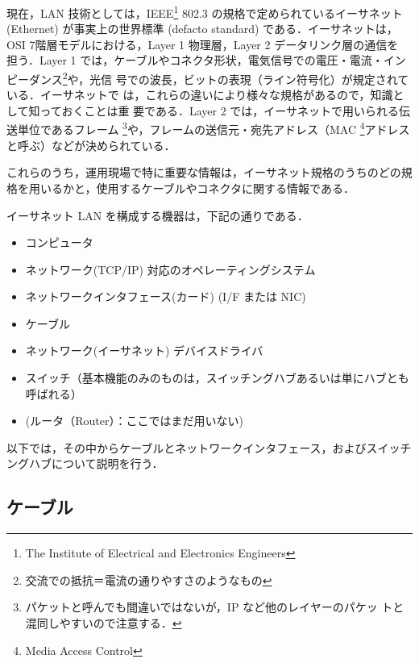 現在，LAN 技術としては，IEEE\footnote{The Institute of Electrical and
Electronics Engineers} 802.3 の規格で定められているイーサネット
(Ethernet) が事実上の世界標準 (defacto standard) である．イーサネットは，
OSI 7階層モデルにおける，Layer 1 物理層，Layer 2 データリンク層の通信を
担う．Layer 1 では，ケーブルやコネクタ形状，電気信号での電圧・電流・イン
ピーダンス\footnote{交流での抵抗＝電流の通りやすさのようなもの}や，光信
号での波長，ビットの表現（ライン符号化）が規定されている．イーサネットで
は，これらの違いにより様々な規格があるので，知識として知っておくことは重
要である．Layer 2 では，イーサネットで用いられる伝送単位であるフレーム
\footnote{パケットと呼んでも間違いではないが，IP など他のレイヤーのパケッ
トと混同しやすいので注意する．}や，フレームの送信元・宛先アドレス（MAC
\footnote{Media Access Control}アドレスと呼ぶ）などが決められている．

これらのうち，運用現場で特に重要な情報は，イーサネット規格のうちのどの規
格を用いるかと，使用するケーブルやコネクタに関する情報である．

イーサネット LAN を構成する機器は，下記の通りである．

\begin{itemize}
\item コンピュータ
\item ネットワーク(TCP/IP) 対応のオペレーティングシステム
\item ネットワークインタフェース(カード) (I/F または NIC)
\item ケーブル
\item ネットワーク(イーサネット) デバイスドライバ
\item スイッチ（基本機能のみのものは，スイッチングハブあるいは単にハブとも呼ばれる）
\item (ルータ（Router）：ここではまだ用いない)
\end{itemize}

以下では，その中からケーブルとネットワークインタフェース，およびスイッチ
ングハブについて説明を行う．


\subsection*{ケーブル}

